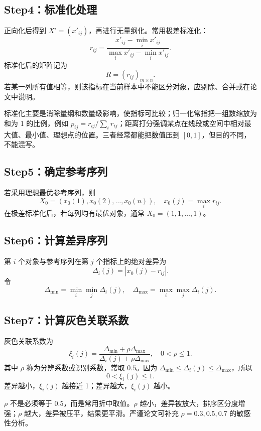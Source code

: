 \documentclass[UTF8,a4paper,11pt]{ctexart}
\begin{document}
\subsection{Step4：标准化处理}
正向化后得到 $X'=(x'_{ij})$，再进行无量纲化。常用极差标准化：
\[
r_{ij}=\frac{x'_{ij}-\min_i x'_{ij}}{\max_i x'_{ij}-\min_i x'_{ij}}.
\]
标准化后的矩阵记为
\[
R=(r_{ij})_{m\times n}.
\]
若某一列所有值相等，则该指标在当前样本中不能区分对象，应剔除、合并或在论文中说明。

\begin{notebox}
标准化主要是消除量纲和数量级影响，使指标可比较；归一化常指把一组数缩放为和为 1 的比例，例如 $p_{ij}=r_{ij}/\sum_i r_{ij}$；距离打分强调某点在线段或空间中相对最大值、最小值、理想点的位置。三者经常都能把数值压到 $[0,1]$，但目的不同，不能混写。
\end{notebox}

\subsection{Step5：确定参考序列}
若采用理想最优参考序列，则
\[
X_0=(x_0(1),x_0(2),\ldots,x_0(n)),\quad x_0(j)=\max_i r_{ij}.
\]
在极差标准化后，若每列均有最优对象，通常 $X_0=(1,1,\ldots,1)$。

\subsection{Step6：计算差异序列}
第 $i$ 个对象与参考序列在第 $j$ 个指标上的绝对差异为
\[
\Delta_i(j)=|x_0(j)-r_{ij}|.
\]
令
\[
\Delta_{\min}=\min_i\min_j \Delta_i(j),\quad
\Delta_{\max}=\max_i\max_j \Delta_i(j).
\]

\subsection{Step7：计算灰色关联系数}
灰色关联系数为
\[
\xi_i(j)=\frac{\Delta_{\min}+\rho\Delta_{\max}}{\Delta_i(j)+\rho\Delta_{\max}},\quad 0<\rho\le 1.
\]
其中 $\rho$ 称为分辨系数或识别系数，常取 $0.5$。因为 $\Delta_{\min}\le \Delta_i(j)\le \Delta_{\max}$，所以
\[
0<\xi_i(j)\le 1.
\]
差异越小，$\xi_i(j)$ 越接近 1；差异越大，$\xi_i(j)$ 越小。

\begin{warnbox}[关于 $\rho=0.5$]
$\rho$ 不是必须等于 $0.5$，而是常用折中取值。$\rho$ 越小，差异被放大，排序区分度增强；$\rho$ 越大，差异被压平，结果更平滑。严谨论文可补充 $\rho=0.3,0.5,0.7$ 的敏感性分析。
\end{warnbox}
\end{document}
